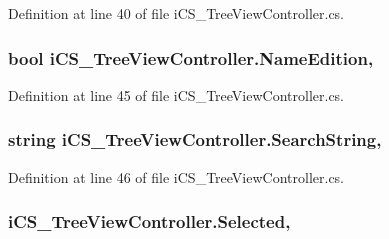 Definition at line 40 of file i\+C\+S\+\_\+\+Tree\+View\+Controller.\+cs.

\hypertarget{classi_c_s___tree_view_controller_ae00b5c6990f701fca30d7722bc7b3199}{
\subsubsection[{Name\+Edition}]{\setlength{\rightskip}{0pt plus 5cm}bool i\+C\+S\+\_\+\+Tree\+View\+Controller.\+Name\+Edition\hspace{0.3cm}{\ttfamily [get]}, {\ttfamily [set]}}}\label{classi_c_s___tree_view_controller_ae00b5c6990f701fca30d7722bc7b3199}


Definition at line 45 of file i\+C\+S\+\_\+\+Tree\+View\+Controller.\+cs.

\hypertarget{classi_c_s___tree_view_controller_a3536a52fd599fdcf44806f98d2d36416}{
\subsubsection[{Search\+String}]{\setlength{\rightskip}{0pt plus 5cm}string i\+C\+S\+\_\+\+Tree\+View\+Controller.\+Search\+String\hspace{0.3cm}{\ttfamily [get]}, {\ttfamily [set]}}}\label{classi_c_s___tree_view_controller_a3536a52fd599fdcf44806f98d2d36416}


Definition at line 46 of file i\+C\+S\+\_\+\+Tree\+View\+Controller.\+cs.

\hypertarget{classi_c_s___tree_view_controller_afc746f70da306d4baf3d21a95ce58b13}{
\subsubsection[{Selected}]{ i\+C\+S\+\_\+\+Tree\+View\+Controller.\+Selected\hspace{0.3cm}{\ttfamily [get]}, {\ttfamily [set]}}}\label{classi_c_s___tree_view_controller_afc746f70da306d4baf3d21a95ce58b13}


